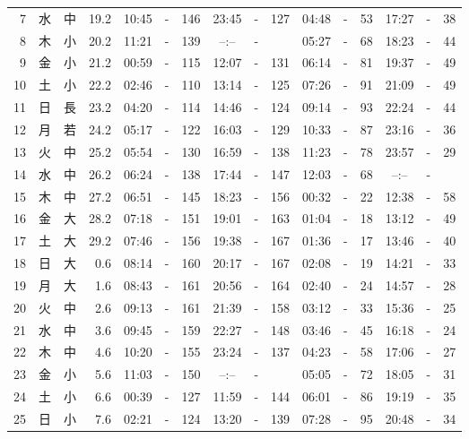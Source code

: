 \documentclass[12pt.a4j]{jsarticle}
\begin{document}
\begin{center}
\begin{table}[ht]
\begin{tabular}{|rc|cr|ccrccr|ccrccr|}
 7 & 水 & 中 & 19.2 &  10:45 &-& 146  &  23:45 &-& 127  &   04:48 &-&  53  &   17:27 &-&  38  \\
 8 & 木 & 小 & 20.2 &  11:21 &-& 139  &  --:-- &-&     &   05:27 &-&  68  &   18:23 &-&  44  \\
 9 & 金 & 小 & 21.2 &  00:59 &-& 115  &  12:07 &-& 131  &   06:14 &-&  81  &   19:37 &-&  49  \\
10 & 土 & 小 & 22.2 &  02:46 &-& 110  &  13:14 &-& 125  &   07:26 &-&  91  &   21:09 &-&  49  \\
11 & 日 & 長 & 23.2 &  04:20 &-& 114  &  14:46 &-& 124  &   09:14 &-&  93  &   22:24 &-&  44  \\
12 & 月 & 若 & 24.2 &  05:17 &-& 122  &  16:03 &-& 129  &   10:33 &-&  87  &   23:16 &-&  36  \\
13 & 火 & 中 & 25.2 &  05:54 &-& 130  &  16:59 &-& 138  &   11:23 &-&  78  &   23:57 &-&  29  \\
14 & 水 & 中 & 26.2 &  06:24 &-& 138  &  17:44 &-& 147  &   12:03 &-&  68  &   --:-- &-&     \\
15 & 木 & 中 & 27.2 &  06:51 &-& 145  &  18:23 &-& 156  &   00:32 &-&  22  &   12:38 &-&  58  \\
16 & 金 & 大 & 28.2 &  07:18 &-& 151  &  19:01 &-& 163  &   01:04 &-&  18  &   13:12 &-&  49  \\
17 & 土 & 大 & 29.2 &  07:46 &-& 156  &  19:38 &-& 167  &   01:36 &-&  17  &   13:46 &-&  40  \\
18 & 日 & 大 &  0.6 &  08:14 &-& 160  &  20:17 &-& 167  &   02:08 &-&  19  &   14:21 &-&  33  \\
19 & 月 & 大 &  1.6 &  08:43 &-& 161  &  20:56 &-& 164  &   02:40 &-&  24  &   14:57 &-&  28  \\
20 & 火 & 中 &  2.6 &  09:13 &-& 161  &  21:39 &-& 158  &   03:12 &-&  33  &   15:36 &-&  25  \\
21 & 水 & 中 &  3.6 &  09:45 &-& 159  &  22:27 &-& 148  &   03:46 &-&  45  &   16:18 &-&  24  \\
22 & 木 & 中 &  4.6 &  10:20 &-& 155  &  23:24 &-& 137  &   04:23 &-&  58  &   17:06 &-&  27  \\
23 & 金 & 小 &  5.6 &  11:03 &-& 150  &  --:-- &-&     &   05:05 &-&  72  &   18:05 &-&  31  \\
24 & 土 & 小 &  6.6 &  00:39 &-& 127  &  11:59 &-& 144  &   06:01 &-&  86  &   19:19 &-&  35  \\
25 & 日 & 小 &  7.6 &  02:21 &-& 124  &  13:20 &-& 139  &   07:28 &-&  95  &   20:48 &-&  34  \\

\end{tabular}
\end{table}
\end{center}
\end{document}
